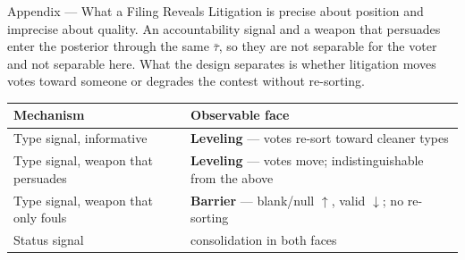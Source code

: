 \begin{frame}{Appendix --- What a Filing Reveals}
Litigation is precise about position and imprecise about quality. An
accountability signal and a weapon that persuades enter the posterior through
the same $\bar\tau$, so they are not separable for the voter and not separable
here. What the design separates is whether litigation moves votes toward
someone or degrades the contest without re-sorting.
\smallskip
\begin{center}\scriptsize
\renewcommand{\arraystretch}{1.3}
\begin{tabular}{ll}
\toprule
\textbf{Mechanism} & \textbf{Observable face}\\
\midrule
Type signal, informative & \textcolor{mygreen}{\textbf{Leveling}} --- votes re-sort toward cleaner types\\
Type signal, weapon that persuades & \textcolor{mygreen}{\textbf{Leveling}} --- votes move; indistinguishable from the above\\
Type signal, weapon that only fouls & \textcolor{myred}{\textbf{Barrier}} --- blank/null $\uparrow$, valid $\downarrow$; no re-sorting\\
Status signal & consolidation in both faces \ns{\citep{myerson1993}}\\
\bottomrule
\end{tabular}
\end{center}
\smallskip
\centerline{\hyperlink{app:transferfoil}{}\quad\hyperlink{src:motivation}{}}
\end{frame}
